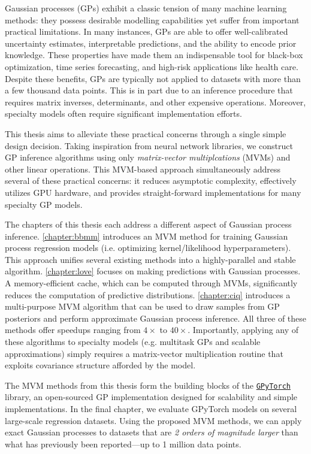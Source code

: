 Gaussian processes (GPs) exhibit a classic tension of many machine learning methods:
they possess desirable modelling capabilities yet suffer from important practical limitations.
In many instances, GPs are able to offer well-calibrated uncertainty estimates, interpretable predictions, and the ability to encode prior knowledge.
These properties have made them an indispensable tool for black-box optimization, time series forecasting, and high-risk applications like health care.
Despite these benefits, GPs are typically not applied to datasets with more than a few thousand data points.
This is in part due to an inference procedure that requires matrix inverses, determinants, and other expensive operations.
Moreover, specialty models often require significant implementation efforts.

This thesis aims to alleviate these practical concerns through a single simple design decision.
Taking inspiration from neural network libraries, we construct GP inference algorithms using only \emph{matrix-vector multiplcations} (MVMs) and other linear operations.
This MVM-based approach simultaneously address several of these practical concerns: it reduces asymptotic complexity, effectively utilizes GPU hardware, and provides straight-forward implementations for many specialty GP models.

The chapters of this thesis each address a different aspect of Gaussian process inference.
\cref{chapter:bbmm} introduces an MVM method for training Gaussian process regression models (i.e. optimizing kernel/likelihood hyperparameters).
This approach unifies several existing methods into a highly-parallel and stable algorithm.
\cref{chapter:love} focuses on making predictions with Gaussian processes.
A memory-efficient cache, which can be computed through MVMs, significantly reduces the computation of predictive distributions.
\cref{chapter:ciq} introduces a multi-purpose MVM algorithm that can be used to draw samples from GP posteriors and perform approximate Gaussian process inference.
All three of these methods offer speedups ranging from $4\times$ to $40\times$.
Importantly, applying any of these algorithms to specialty models (e.g. multitask GPs and scalable approximations) simply requires a matrix-vector multiplication routine that exploits covariance structure afforded by the model.

The MVM methods from this thesis form the building blocks of the \href{http://github.com/cornellius-gp/gpytorch}{\tt GPyTorch} library, an open-sourced GP implementation designed for scalability and simple implementations.
In the final chapter, we evaluate GPyTorch models on several large-scale regression datasets.
Using the proposed MVM methods, we can apply exact Gaussian processes to datasets that are \emph{2 orders of magnitude larger} than what has previously been reported---up to 1 million data points.
